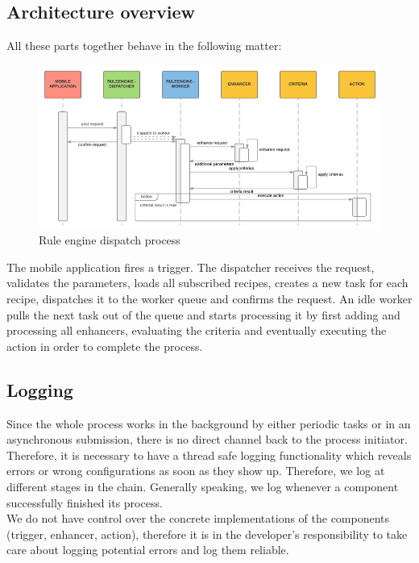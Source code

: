 \documentclass[11pt]{article} %
\begin{document}
\subsection{Architecture overview}
All these parts together behave in the following matter:\\

\begin{figure}[H]
\begin{center}
\includegraphics[width=\textwidth]{ruleengine_dispatch_process}
\end{center}
\caption{Rule engine dispatch process}
\label{fig:ruleengine_dispatch_process}
\end{figure}

The mobile application fires a trigger. The dispatcher receives the request, validates the parameters, loads all subscribed recipes, creates a new task for each recipe, dispatches it to the worker queue and confirms the request. An idle worker pulls the next task out of the queue and starts processing it by first adding and processing all enhancers, evaluating the criteria and eventually executing the action in order to complete the process.

\subsection{Logging}

Since the whole process works in the background by either periodic tasks or in an asynchronous submission, there is no direct channel back to the process initiator. Therefore, it is necessary to have a thread safe logging functionality which reveals errors or wrong configurations as soon as they show up. Therefore, we log at different stages in the chain. Generally speaking, we log whenever a component successfully finished its process.\\

We do not have control over the concrete implementations of the components (trigger, enhancer, action), therefore it is in the developer's responsibility to take care about logging potential errors and log them reliable.\\
\end{document}
